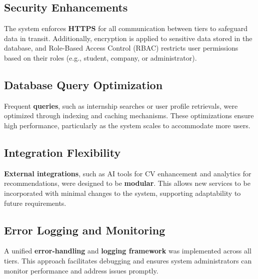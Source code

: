 \subsection{Security Enhancements}

The system enforces \textbf{HTTPS} for all communication between tiers to safeguard data in transit. Additionally, encryption is applied to sensitive data stored in the database, and Role-Based Access Control (RBAC) restricts user permissions based on their roles (e.g., student, company, or administrator).

\subsection{Database Query Optimization}

Frequent \textbf{queries}, such as internship searches or user profile retrievals, were optimized through indexing and caching mechanisms. These optimizations ensure high performance, particularly as the system scales to accommodate more users.

\subsection{Integration Flexibility}

\textbf{External integrations}, such as AI tools for CV enhancement and analytics for recommendations, were designed to be \textbf{modular}. This allows new services to be incorporated with minimal changes to the system, supporting adaptability to future requirements.

\subsection{Error Logging and Monitoring}

A unified \textbf{error-handling} and \textbf{logging framework} was implemented across all tiers. This approach facilitates debugging and ensures system administrators can monitor performance and address issues promptly.

